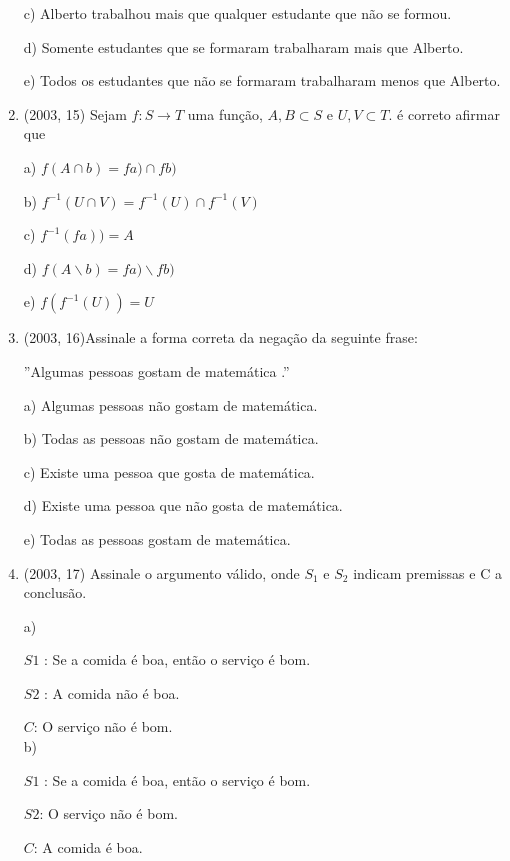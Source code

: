 \documentclass{article}
\begin{document}
\begin{enumerate}
c) Alberto trabalhou mais que qualquer estudante que não se formou.

d) Somente estudantes que se formaram trabalharam mais que Alberto.

e) Todos os estudantes que não se formaram trabalharam menos que Alberto.\newline







\item(2003, 15) Sejam $f : S \rightarrow T$ uma função, $A, B \subset S$ e $U, V \subset T .$ é correto afirmar que

a) $f(A \cap b)=fa) \cap fb)$

b) $f^{-1}(U \cap V)=f^{-1}(U) \cap f^{-1}(V)$

c) $f^{-1}(fa))=A$

d) $f(A \backslash b)=fa) \backslash fb)$

e) $f\left(f^{-1}(U)\right)=U$ \newline

\item(2003, 16)Assinale a forma correta da negação da seguinte frase:

”Algumas pessoas gostam de matemática .”

a) Algumas pessoas não gostam de matemática.

b) Todas as pessoas não gostam de matemática.

c) Existe uma pessoa que gosta de matemática.

d) Existe uma pessoa que não gosta de matemática.

e) Todas as pessoas gostam de matemática. \newline




\item(2003, 17) Assinale o argumento válido, onde $S_1$ e $S_2$ indicam premissas e C a conclusão.

a)

$S 1$ : Se a comida é boa, então o serviço é bom.

$S 2$ : A comida não é boa.

$C$: O serviço não é bom.\\

b)

$S 1$ : Se a comida é boa, então o serviço é bom.

$S 2$: O serviço não é bom.

$C$: A comida é boa.\\


\end{enumerate}
\end{document}
